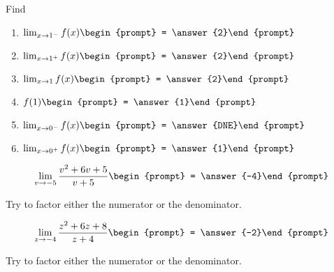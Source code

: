 \documentclass{ximera}
\begin{document}
\begin{exercise}
Find
  \begin{enumerate}
\item		$\lim_{x\to 1^-} f(x)\begin{prompt} = \answer{2}\end{prompt}$
\item		$\lim_{x\to 1^+} f(x)\begin{prompt} = \answer{2}\end{prompt}$
\item		$\lim_{x\to 1} f(x)\begin{prompt} = \answer{2}\end{prompt}$
\item		$f({1})\begin{prompt} = \answer{1}\end{prompt}$
\item		$\lim_{x\to 0^-} f(x)\begin{prompt} = \answer{DNE}\end{prompt}$
\item		$\lim_{x\to 0^+} f(x)\begin{prompt} = \answer{1}\end{prompt}$
  \end{enumerate}

\end{exercise}







\begin{exercise}

\[
\lim_{v\to -5 } \frac{v^2+6 v+5}{v+5}\begin{prompt} = \answer{-4}\end{prompt}
\]
\begin{hint}
Try to factor either the numerator or the denominator.
\end{hint}
\end{exercise}



\begin{exercise}

\[
\lim_{z\to -4 } \frac{z^2+6 z+8}{z+4}\begin{prompt} = \answer{-2}\end{prompt}
\]
\begin{hint}
Try to factor either the numerator or the denominator.
\end{hint}
\end{exercise}
\end{document}
